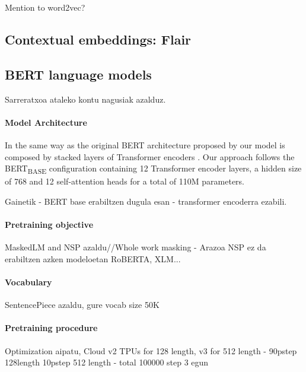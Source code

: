 \documentclass[10pt, a4paper]{article}
\begin{document}
Mention to word2vec?


\subsection{Contextual embeddings: Flair}
\label{sec:build-basq-models:flair}

\cite{akbik2018coling}


\subsection{BERT language models}
\label{sec:build-basq-models:bert}



Sarreratxoa ataleko kontu nagusiak azalduz. 

\paragraph{Model Architecture}

In the same way as the original BERT architecture proposed by  our model is composed by stacked layers of Transformer encoders \cite{vaswani2017attention}. Our approach follows the BERT\textsubscript{BASE} configuration containing 12 Transformer encoder layers, a hidden size of 768 and 12 self-attention heads for a total of 110M parameters. 

Gainetik - BERT base erabiltzen dugula esan - transformer encoderra ezabili.

\paragraph{Pretraining objective}

MaskedLM and NSP azaldu//Whole work masking - Arazoa NSP ez da erabiltzen azken modeloetan RoBERTA, XLM...


\paragraph{Vocabulary}

SentencePiece azaldu,  gure vocab size 50K

\paragraph{Pretraining procedure}

Optimization aipatu, Cloud v2 TPUs for 128 length, v3 for 512 length - 90pstep 128length 10pstep 512 length - total 100000 step 3 egun
\end{document}

